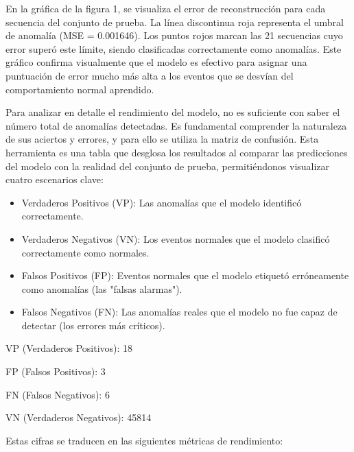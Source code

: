 En la gráfica de la figura 1, se visualiza el error de reconstrucción para cada secuencia del conjunto de prueba. La línea discontinua roja representa el umbral de anomalía (MSE = 0.001646). Los puntos rojos marcan las 21 secuencias cuyo error superó este límite, siendo clasificadas correctamente como anomalías. Este gráfico confirma visualmente que el modelo es efectivo para asignar una puntuación de error mucho más alta a los eventos que se desvían del comportamiento normal aprendido.

Para analizar en detalle el rendimiento del modelo, no es suficiente con saber el número total de anomalías detectadas. Es fundamental comprender la naturaleza de sus aciertos y errores, y para ello se utiliza la matriz de confusión. Esta herramienta es una tabla que desglosa los resultados al comparar las predicciones del modelo con la realidad del conjunto de prueba, permitiéndonos visualizar cuatro escenarios clave:

\begin{itemize}
  \item Verdaderos Positivos (VP): Las anomalías que el modelo identificó correctamente.
  \item Verdaderos Negativos (VN): Los eventos normales que el modelo clasificó correctamente como normales.
  \item Falsos Positivos (FP): Eventos normales que el modelo etiquetó erróneamente como anomalías (las "falsas alarmas").
  \item Falsos Negativos (FN): Las anomalías reales que el modelo no fue capaz de detectar (los errores más críticos).
\end{itemize}

VP (Verdaderos Positivos): 18

FP (Falsos Positivos): 3

FN (Falsos Negativos): 6

VN (Verdaderos Negativos): 45814

Estas cifras se traducen en las siguientes métricas de rendimiento:

